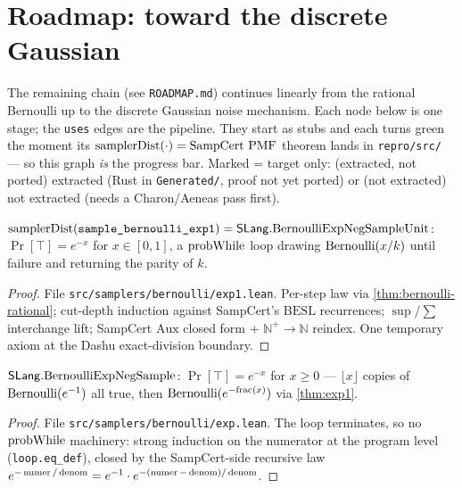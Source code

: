 \chapter{Roadmap: toward the discrete Gaussian}\label{chap:roadmap}

The remaining chain (see \texttt{ROADMAP.md}) continues linearly from the rational
Bernoulli up to the discrete Gaussian noise mechanism. Each node below is one
stage; the \texttt{uses} edges are the pipeline. They start as stubs and each turns
green the moment its \(\mathrm{samplerDist}(\cdot) = \text{SampCert PMF}\) theorem lands in
\texttt{repro/src/} --- so this graph \emph{is} the progress bar. Marked
\statusStub{} = target only: (extracted, not ported) extracted (Rust in \texttt{Generated/}, proof not
yet ported) or (not extracted) not extracted (needs a Charon/Aeneas pass first).

\begin{theorem}\label{thm:exp1}
  \leanok
  \(\mathrm{samplerDist}(\texttt{sample\_bernoulli\_exp1}) =
  \mathsf{SLang}.\mathrm{BernoulliExpNegSampleUnit}\): \(\Pr[\top] = e^{-x}\) for
  \(x \in [0,1]\), a \(\mathrm{probWhile}\) loop drawing \(\mathrm{Bernoulli}(x/k)\) until failure and
  returning the parity of \(k\). \statusDone
\end{theorem}
\begin{proof}\leanok
  File \texttt{src/samplers/bernoulli/exp1.lean}. Per-step law via
  \ref{thm:bernoulli-rational}; cut-depth induction against SampCert's
  \(\mathrm{BESL}\) recurrences; \(\sup\)/\(\sum\) interchange lift; SampCert
  \(\mathrm{Aux}\) closed form + \(\mathbb{N}^{+}\!\to\mathbb{N}\) reindex. One
  temporary axiom at the Dashu exact-division boundary.
\end{proof}

\begin{theorem}\label{thm:exp}
  \leanok
  \(\mathsf{SLang}.\mathrm{BernoulliExpNegSample}\): \(\Pr[\top]=e^{-x}\)
  for \(x \ge 0\) --- \(\lfloor x\rfloor\) copies of \(\mathrm{Bernoulli}(e^{-1})\) all true, then
  \(\mathrm{Bernoulli}(e^{-\mathrm{frac}(x)})\) via \ref{thm:exp1}. \statusDone
\end{theorem}
\begin{proof}\leanok
  File \texttt{src/samplers/bernoulli/exp.lean}. The loop terminates, so no
  \(\mathrm{probWhile}\) machinery: strong induction on the numerator at the program
  level (\texttt{loop.eq\_def}), closed by the SampCert-side recursive law
  \(e^{-\operatorname{numer}/\operatorname{denom}} = e^{-1}\cdot e^{-(\operatorname{numer}-\operatorname{denom})/\operatorname{denom}}\).
\end{proof}

